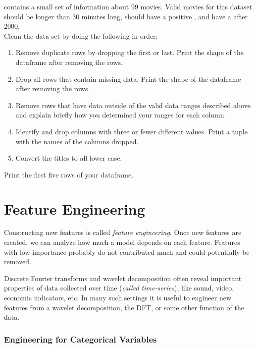 \begin{problem}
 contains a small set of information about 99 movies. Valid movies for this dataset should be longer than $30$ minutes long, should have a positive , and have a  after $2000$.
\\

\noindent Clean the data set by doing the following in order: 

\begin{enumerate}

 \item Remove duplicate rows by dropping the first or last. Print the shape of the dataframe after removing the rows.

 \item Drop all rows that contain missing data. Print the shape of the dataframe after removing the rows.

 \item Remove rows that have data outside of the valid data ranges described above and explain briefly how you determined your ranges for each column.
 
 \item Identify and drop columns with three or fewer different values. Print a tuple with the names of the columns dropped.

 \item Convert the titles to all lower case.

\end{enumerate}
Print the first five rows of your dataframe.
\end{problem}

\section*{Feature Engineering}

Constructing new features is called \emph{feature engineering}.
Once new features are created, we can analyze how much a model depends on each feature. 
Features with low importance probably do not contributed much and could potentially be removed.

Discrete Fourier transforms and wavelet decomposition often reveal important properties of data collected over time (\emph{called time-series}), like sound, video, economic indicators, etc.  In many such settings it is useful to engineer new features from a  wavelet decomposition, the DFT, or some other function of the data.

\subsubsection{Engineering for Categorical Variables}

